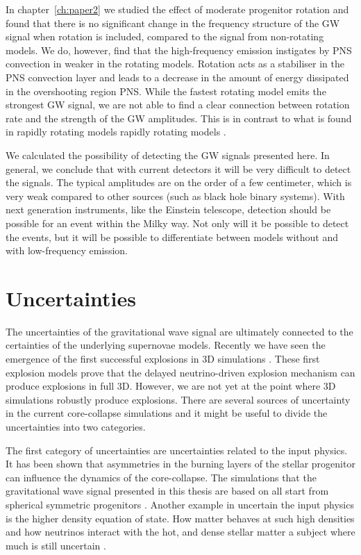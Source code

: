 In chapter~\ref{ch:paper2} we studied the effect of moderate progenitor rotation and found that
there is no significant change in the frequency structure of the GW signal when rotation is included, compared to the signal from non-rotating models. We do, however, find that the high-frequency emission instigates by PNS convection in weaker in the rotating models.
Rotation acts as a stabiliser in the PNS convection layer and leads to a decrease in the amount of energy dissipated in the overshooting region PNS.
While the fastest rotating model emits the strongest GW signal, we are not able to find a clear connection between rotation rate and
the strength of the GW amplitudes. This is in contrast to what is found in rapidly rotating models rapidly rotating models 
\citep{rampp_98,shibata_05,ott_05,kuroda_14,takiwaki_16}.

We calculated the possibility of detecting the GW signals presented here. In general, we conclude that with current detectors it will be very difficult to detect the signals. The typical amplitudes are
on the order of a few centimeter, which is very weak compared to other sources (such as black hole binary systems).
With next generation instruments, like the Einstein telescope, detection should be possible for an event within the 
Milky way. Not only will it be possible to detect the events, but it will be possible to
differentiate between models without and with low-frequency emission.

\section{Uncertainties}
The uncertainties of the gravitational wave signal are ultimately connected to the certainties
of the underlying supernovae models. Recently we have seen the emergence of the first successful explosions 
in 3D simulations \citep{melson_15a,melson_15b,lentz_15,suma_models}. 
These first explosion models prove that the delayed neutrino-driven explosion mechanism can produce explosions in full 3D. 
However, we are not yet at the point where 3D simulations robustly produce explosions. 
There are several sources of uncertainty in the current core-collapse simulations and it might be useful to divide the uncertainties into two categories. 

The first category of uncertainties are uncertainties related to the input physics. 
It has been shown that asymmetries in the burning layers of the stellar progenitor can influence the dynamics of the core-collapse. 
The simulations that the gravitational wave signal presented in this thesis are based on all start from spherical symmetric progenitors
\citep{burrows_96,fryer_04,arnett_11,couch_13,mueller_15a}. 
Another example in uncertain the input physics is the higher density equation of state. 
How matter behaves at such high densities and how neutrinos interact with the hot, and dense 
stellar matter a subject where much is still uncertain \citep{fischer_14,lattimer_16}.

